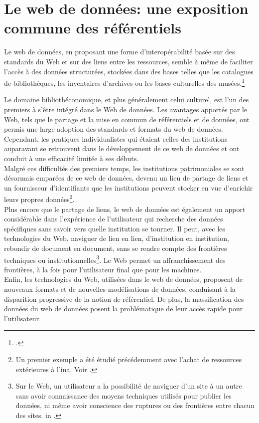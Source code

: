 \chapter{\label{II-A}Le web de données: une exposition commune des référentiels}

\begin{citationLongue}
	Le web de données, en proposant une forme d'interopérabilité basée sur des standards du Web et sur des liens entre les ressources, semble à même de faciliter l'accès à des données structurées, stockées dans des bases telles que les catalogues de bibliothèques, les inventaires d'archives ou les bases culturelles des musées.\footcite[p.45]{dalbin_approches_2011}
\end{citationLongue}
\medskip
Le domaine bibliothéconomique, et plus généralement celui culturel, est l'un des premiers à s'être intégré dans le Web de données. Les avantages apportés par le Web, tels que le partage et la mise en commun de référentiels et de données, ont permis une large adoption des standards et formats du web de données. Cependant, les pratiques individualistes qui étaient celles des institutions auparavant se retrouvent dans le développement de ce web de données et ont conduit à une efficacité limitée à ses débuts.\\

Malgré ces difficultés des premiers temps, les institutions patrimoniales se sont désormais emparées de ce web de données, devenu un lieu de partage de liens et un fournisseur d'identifiants que les institutions peuvent stocker en vue d'enrichir leurs propres données\footnote{Un premier exemple a été étudié précédemment avec l'achat de ressources extérieures à l'\ac{ina}. Voir .}.\\

Plus encore que le partage de liens, le web de données est également un apport considérable dans l'expérience de l'utilisateur qui recherche des données spécifiques sans savoir vers quelle institution se tourner. Il peut, avec les technologies du Web, naviguer de lien en lien, d'institution en institution, rebondir de document en document, sans se rendre compte des frontières techniques ou institutionnelles\footnote{\og Sur le Web, un utilisateur a la possibilité de naviguer d'un site à un autre sans avoir connaissance des moyens techniques utilisés pour publier les données, ni même avoir conscience des ruptures ou des frontières entre chacun des sites. \fg{} in \cite[p.45]{dalbin_approches_2011}.}. Le Web permet un affranchissement des frontières, à la fois pour l'utilisateur final que pour les machines.\\

Enfin, les technologies du Web, utilisées dans le web de données, proposent de nouveaux formats et de nouvelles modélisations de données, conduisant à la disparition progressive de la notion de référentiel. De plus, la massification des données du web de données posent la problématique de leur accès rapide pour l'utilisateur.





